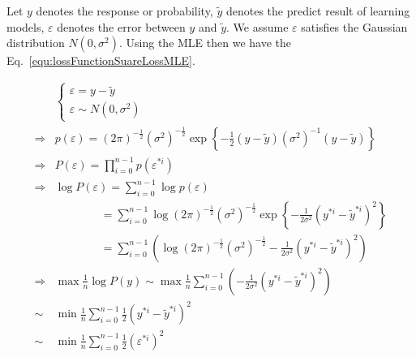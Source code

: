 \documentclass[runningheads,openany]{xhlPaper}
\begin{document}
Let $y$ denotes the response or probability, $\tilde{y}$ denotes the predict result of learning models, $\varepsilon$ denotes the error between $y$ and $\tilde{y}$. We assume $\varepsilon$ satisfies the Gaussian distribution $N\left( {0,{\sigma ^2}} \right)$. Using the MLE then we have the Eq.~\ref{equ:lossFunctionSuareLossMLE}.

\begin{equation}
\label{equ:lossFunctionSuareLossMLE}
\begin{aligned}
&\left\{ {\begin{array}{*{20}{c}}
{\varepsilon  = y - \tilde y}\\
{\varepsilon  \sim N\left( {0,{\sigma ^2}} \right)}
\end{array}} \right.\\
 \Rightarrow &p\left( \varepsilon  \right) = {\left( {2\pi } \right)^{ - \frac{1}{2}}}{\left( {{\sigma ^2}} \right)^{ - \frac{1}{2}}}\exp \left\{ { - \frac{1}{2}\left( {y - \tilde y} \right){{\left( {{\sigma ^2}} \right)}^{ - 1}}\left( {y - \tilde y} \right)} \right\}\\
 \Rightarrow &P\left( \varepsilon  \right) = \prod\limits_{i = 0}^{n - 1} {p\left( {{\varepsilon ^{*i}}} \right)} \\
 \Rightarrow &\log P\left( \varepsilon  \right) = \sum\limits_{i = 0}^{n - 1} {\log p\left( \varepsilon  \right)} \\
 &\quad\quad\quad\quad= \sum\limits_{i = 0}^{n - 1} {\log {{\left( {2\pi } \right)}^{ - \frac{1}{2}}}{{\left( {{\sigma ^2}} \right)}^{ - \frac{1}{2}}}\exp \left\{ { - \frac{1}{{2{\sigma ^2}}}{{\left( {{y^{*i}} - {{\tilde y}^{*i}}} \right)}^2}} \right\}} \\
 &\quad\quad\quad\quad= \sum\limits_{i = 0}^{n - 1} {\left( {\log {{\left( {2\pi } \right)}^{ - \frac{1}{2}}}{{\left( {{\sigma ^2}} \right)}^{ - \frac{1}{2}}} - \frac{1}{{2{\sigma ^2}}}{{\left( {{y^{*i}} - {{\tilde y}^{*i}}} \right)}^2}} \right)} \\
 \Rightarrow &\max \frac{1}{n}\log P\left( {y} \right) \sim \max \frac{1}{n}\sum\limits_{i = 0}^{n - 1} {\left( { - \frac{1}{{2{\sigma ^2}}}{{\left( {{y^{*i}} - {{\tilde y}^{*i}}} \right)}^2}} \right)}  \\
 \sim &\min \frac{1}{n}\sum\limits_{i = 0}^{n - 1} {\frac{1}{2}{{\left( {{y^{*i}} - {{\tilde y}^{*i}}} \right)}^2}} \\
 \sim &\min \frac{1}{n}\sum\limits_{i = 0}^{n - 1} {\frac{1}{2}{{\left( {{\varepsilon ^{*i}}} \right)}^2}} 
\end{aligned}
\end{equation}
\end{document}
